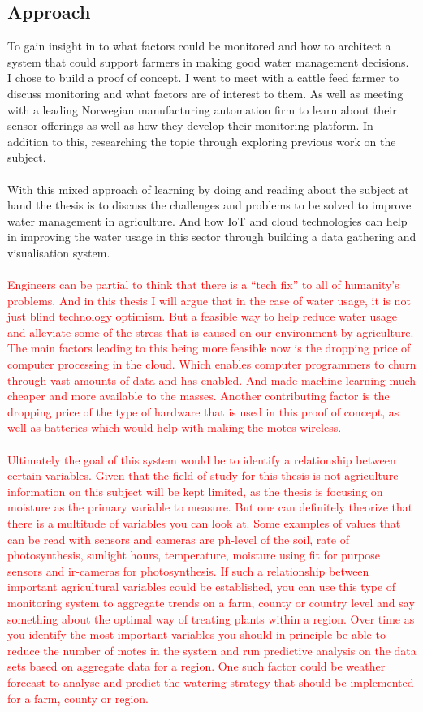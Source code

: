 \documentclass[]{uiophd}
\begin{document}
\subsection{Approach}
To gain insight in to what factors could be monitored and how to architect a system that could support farmers in making good water management decisions. I chose to build a proof of concept. I went to meet with a cattle feed farmer to discuss monitoring and what factors are of interest to them. As well as meeting with a leading Norwegian manufacturing automation firm to learn about their sensor offerings as well as how they develop their monitoring platform. In addition to this, researching the topic through exploring previous work on the subject.
\\\\
With this mixed approach of learning by doing and reading about the subject at hand the thesis is to discuss the challenges and problems to be solved to improve water management in agriculture. And how IoT and cloud technologies can help in improving the water usage in this sector through building a data gathering and visualisation system.
\\\\
\textcolor{red}{Engineers can be partial to think that there is a “tech fix” to all of humanity's problems. And in this thesis I will argue that in the case of water usage, it is not just blind technology optimism. But a feasible way to help reduce water usage and alleviate some of the stress that is caused on our environment by agriculture. The main factors leading to this being more feasible now is the dropping price of computer processing in the cloud. Which enables computer programmers to churn through vast amounts of data and has enabled. And made machine learning much cheaper and more available to the masses. Another contributing factor is the dropping price of the type of hardware that is used in this proof of concept, as well as batteries which would help with making the motes wireless.
\\\\
Ultimately the goal of this system would be to identify a relationship between certain variables.  Given that the field of study for this thesis is not agriculture information on this subject will be kept limited, as the thesis is focusing on moisture as the primary variable to measure. But one can definitely theorize that there is a multitude of variables you can look at. Some examples of values that can be read with sensors and cameras are ph-level of the soil, rate of photosynthesis, sunlight hours, temperature, moisture using fit for purpose sensors and ir-cameras for photosynthesis. If such a relationship between important agricultural variables could be established, you can use this type of monitoring system to aggregate trends on a farm, county or country level and say something about the optimal way of treating plants within a region. Over time as you identify the most important variables you should in principle be able to reduce the number of motes in the system and run predictive analysis on the data sets based on aggregate data for a region. One such factor could be weather forecast to analyse and predict the watering strategy that should be implemented for a farm, county or region. }
\end{document}
